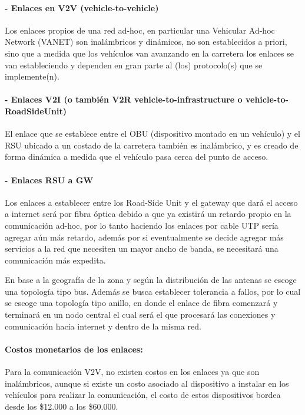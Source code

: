 \documentclass[12pt]{article}
\begin{document}
\paragraph{- Enlaces en V2V (vehicle-to-vehicle)\\}
Los enlaces propios de una red ad-hoc, en particular una Vehicular Ad-hoc Network (VANET) son 
inalámbricos y dinámicos, no son 
establecidos a priori, sino que a medida que los vehículos van avanzando en la carretera los enlaces se 
van estableciendo y dependen en gran parte al (los) protocolo(s) que se implemente(n).\\

\paragraph{- Enlaces V2I (o también V2R vehicle-to-infrastructure o vehicle-to-RoadSideUnit)\\}
El enlace que se establece entre el OBU (dispositivo montado en un vehículo) y el RSU ubicado a un 
costado de la carretera también es inalámbrico, y es creado de forma dinámica a medida que el vehículo 
pasa cerca del punto de acceso.\\

\paragraph{- Enlaces RSU a GW\\}
Los enlaces a establecer entre los Road-Side Unit y el gateway que dará el acceso a internet será por 
fibra óptica debido a que ya existirá un retardo propio en la comunicación ad-hoc, por lo tanto haciendo
los enlaces por cable UTP sería agregar aún más retardo, además por si eventualmente se decide agregar 
más servicios a la red que necesiten un mayor ancho de banda, se necesitará una comunicación más 
expedita.

En base a la geografía de la zona y según la distribución de las antenas se escoge una topología tipo 
bus. Además se busca establecer tolerancia a fallos, por lo cual se escoge una topología tipo anillo, 
en donde el enlace de fibra comenzará y terminará en un nodo central el cual será el que procesará las 
conexiones y comunicación hacia internet y dentro de la misma red.
\paragraph{Costos monetarios de los enlaces:\\}
Para la comunicación V2V, no existen costos en los enlaces ya que son inalámbricos, aunque si 
existe un costo asociado al dispositivo a instalar en los vehículos para realizar la comunicación, el 
costo de estos dispositivos bordea desde los \$12.000 a los \$60.000.
\end{document}
